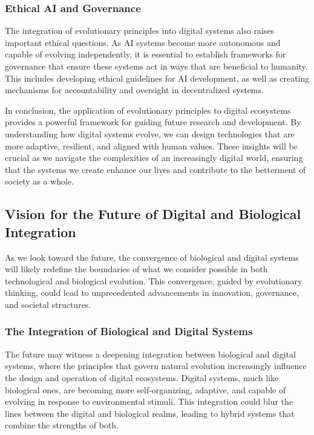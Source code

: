 \documentclass[12pt,twoside]{article}
\begin{document}
\subsubsection{Ethical AI and Governance}

The integration of evolutionary principles into digital systems also raises important ethical questions. As AI systems become more autonomous and capable of evolving independently, it is essential to establish frameworks for governance that ensure these systems act in ways that are beneficial to humanity. This includes developing ethical guidelines for AI development, as well as creating mechanisms for accountability and oversight in decentralized systems.

In conclusion, the application of evolutionary principles to digital ecosystems provides a powerful framework for guiding future research and development. By understanding how digital systems evolve, we can design technologies that are more adaptive, resilient, and aligned with human values. These insights will be crucial as we navigate the complexities of an increasingly digital world, ensuring that the systems we create enhance our lives and contribute to the betterment of society as a whole.

\subsection{Vision for the Future of Digital and Biological Integration}

As we look toward the future, the convergence of biological and digital systems will likely redefine the boundaries of what we consider possible in both technological and biological evolution. This convergence, guided by evolutionary thinking, could lead to unprecedented advancements in innovation, governance, and societal structures.

\subsubsection{The Integration of Biological and Digital Systems}

The future may witness a deepening integration between biological and digital systems, where the principles that govern natural evolution increasingly influence the design and operation of digital ecosystems. Digital systems, much like biological ones, are becoming more self-organizing, adaptive, and capable of evolving in response to environmental stimuli. This integration could blur the lines between the digital and biological realms, leading to hybrid systems that combine the strengths of both.
\end{document}
